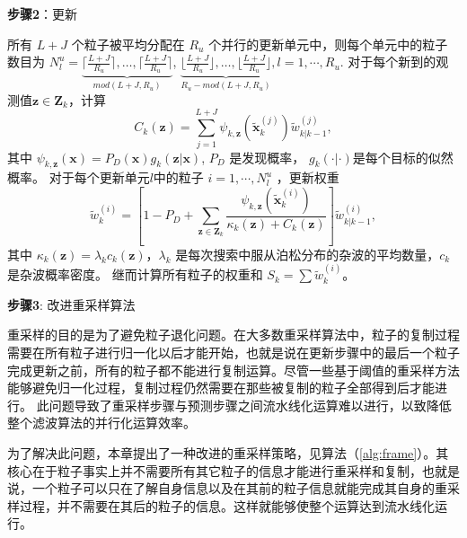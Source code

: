 \textbf{步骤2}：更新

所有 $L+J$ 个粒子被平均分配在 $R_{u}$ 个并行的更新单元中，则每个单元中的粒子数目为 $N_l^u = \underbrace{\lceil\frac{L+J}{R_{u}} \rceil,\dots,\lceil\frac{L+J}{R_{u}} \rceil}_{mod(L+J,R_{u})}$, $\underbrace{\lfloor\frac{L+J}{R_{u}} \rfloor,\dots,\lfloor\frac{L+J}{R_{u}} \rfloor}_{R_{u}-mod(L+J,R_{u})}, l=1,\cdots,R_u$. 对于每个新到的观测值$\mathbf{z}\in \mathbf{Z}_k$，计算
\begin{equation}\label{Eq:04}
C_k(\mathbf{z})=\sum_{j=1}^{L+J}\psi_{k,\mathbf{z}}(\tilde{\mathbf{x}}_k^{(j)})\tilde{w}_{k|k-1}^{(j)},
\end{equation}
其中 $\psi_{k,\mathbf{z}}(\mathbf{x})=P_D(\mathbf{x})g_k(\mathbf{z}|\mathbf{x})$, $P_D$ 是发现概率， $g_k(\cdot|\cdot)$是每个目标的似然概率。
对于每个更新单元$l$中的粒子 $i=1,\cdots,N_l^u$ ，更新权重
\begin{equation}\label{Eq:05}
\tilde{w}_k^{(i)}=\left[1-P_D+\sum_{\mathbf{z}\in
\mathbf{Z}_k}\frac{\psi_{k,\mathbf{z}}(\tilde{\mathbf{x}}_k^{(i)})}{\kappa_k(\mathbf{z})+C_k(\mathbf{z})}\right]\tilde{w}_{k|k-1}^{(i)},
\end{equation}
其中 $\kappa_k(\mathbf{z})=\lambda_k c_k(\mathbf{z})$，$\lambda_k$ 是每次搜索中服从泊松分布的杂波的平均数量，$c_k$是杂波概率密度。
继而计算所有粒子的权重和 $S_k=\sum{{\tilde{w}}_k^{(i)}}$。

\textbf{步骤3}: 改进重采样算法

重采样的目的是为了避免粒子退化问题。在大多数重采样算法中，粒子的复制过程需要在所有粒子进行归一化以后才能开始，也就是说在更新步骤中的最后一个粒子完成更新之前，所有的粒子都不能进行复制运算。尽管一些基于阈值的重采样方法能够避免归一化过程，复制过程仍然需要在那些被复制的粒子全部得到后才能进行。 此问题导致了重采样步骤与预测步骤之间流水线化运算难以进行，以致降低整个滤波算法的并行化运算效率。

为了解决此问题，本章提出了一种改进的重采样策略，见算法（\ref{alg:frame}）。其核心在于粒子事实上并不需要所有其它粒子的信息才能进行重采样和复制，也就是说，一个粒子可以只在了解自身信息以及在其前的粒子信息就能完成其自身的重采样过程，并不需要在其后的粒子的信息。这样就能够使整个运算达到流水线化运行。


